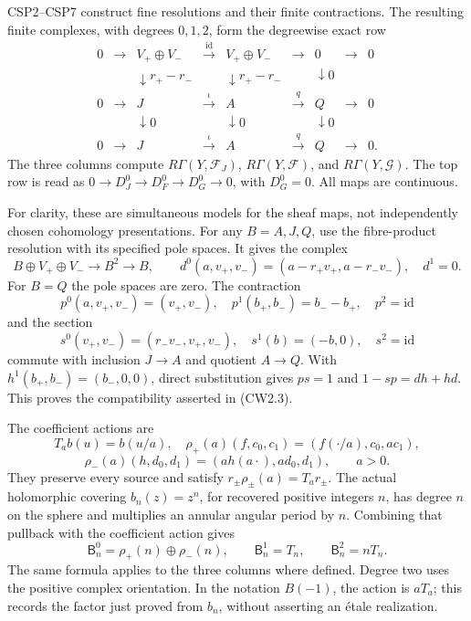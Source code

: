 CSP2--CSP7 construct fine resolutions and their finite contractions. The
resulting finite complexes, with degrees \(0,1,2\), form the degreewise
exact row \[
\begin{array}{ccccccccc}
0&\to&V_+\oplus V_-&\xrightarrow{\mathrm{id}}&
V_+\oplus V_-&\to&0&\to&0\\
 &&\downarrow r_+-r_-&&\downarrow r_+-r_-&&\downarrow0\\
0&\to&J&\xrightarrow{\iota}&A&\xrightarrow{q}&Q&\to&0\\
 &&\downarrow0&&\downarrow0&&\downarrow0\\
0&\to&J&\xrightarrow{\iota}&A&\xrightarrow{q}&Q&\to&0.
\end{array}
\tag{CW2.3}
\] The three columns compute \(R\Gamma(Y,\mathscr F_J)\),
\(R\Gamma(Y,\mathscr F)\), and \(R\Gamma(Y,\mathscr G)\). The top row is
read as \(0\to D_J^0\to D_F^0\to D_G^0\to0\), with \(D_G^0=0\). All maps
are continuous.

For clarity, these are simultaneous models for the sheaf maps, not
independently chosen cohomology presentations. For any \(B=A,J,Q\), use
the fibre-product resolution with its specified pole spaces. It gives
the complex \[
B\oplus V_+\oplus V_-\longrightarrow B^2\longrightarrow B,
\qquad d^0(a,v_+,v_-)=(a-r_+v_+,a-r_-v_-),\quad d^1=0.
\] For \(B=Q\) the pole spaces are zero. The contraction \[
p^0(a,v_+,v_-)=(v_+,v_-),\quad
p^1(b_+,b_-)=b_--b_+,\quad p^2=\mathrm{id}
\] and the section \[
s^0(v_+,v_-)=(r_-v_-,v_+,v_-),\quad
s^1(b)=(-b,0),\quad s^2=\mathrm{id}
\tag{CW2.4}
\] commute with inclusion \(J\to A\) and quotient \(A\to Q\). With
\(h^1(b_+,b_-)=(b_-,0,0)\), direct substitution gives \(ps=1\) and
\(1-sp=dh+hd\). This proves the compatibility asserted in (CW2.3).

The coefficient actions are \[
T_a b(u)=b(u/a),\quad
\rho_+(a)(f,c_0,c_1)=(f(\cdot/a),c_0,ac_1),
\] \[
\rho_-(a)(h,d_0,d_1)=(a h(a\cdot),ad_0,d_1),\qquad a>0.
\tag{CW2.5}
\] They preserve every source and satisfy \(r_\pm\rho_\pm(a)=T_ar_\pm\).
The actual holomorphic covering \(b_n(z)=z^n\), for recovered positive
integers \(n\), has degree \(n\) on the sphere and multiplies an annular
angular period by \(n\). Combining that pullback with the coefficient
action gives \[
\mathsf B_n^0=\rho_+(n)\oplus\rho_-(n),\qquad
\mathsf B_n^1=T_n,\qquad
\mathsf B_n^2=nT_n.
\tag{CW2.6}
\] The same formula applies to the three columns where defined. Degree
two uses the positive complex orientation. In the notation \(B(-1)\),
the action is \(aT_a\); this records the factor just proved from
\(b_n\), without asserting an étale realization.

